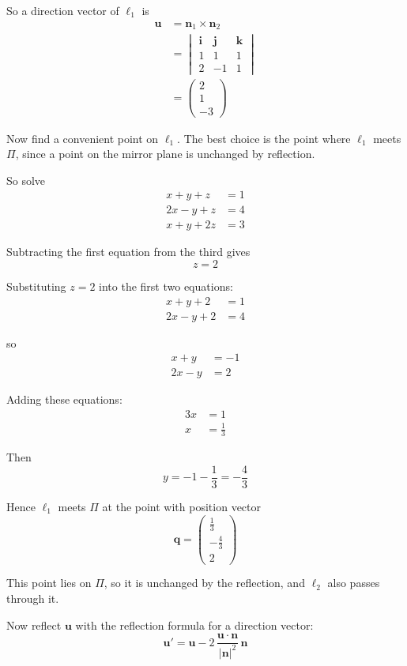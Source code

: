 \documentclass[leqno]{article}
\begin{document}
\begin{enumerate}[
  label=\textbf{\arabic*.},
  leftmargin=*,
  topsep=0pt,
  partopsep=0pt,
  parsep=0pt
]
\begin{djsSolution}
So a direction vector of \(\ell_1\) is
\begin{align*}
\mathbf u&=\mathbf n_1\times \mathbf n_2\\
&=
\begin{vmatrix}
\mathbf i&\mathbf j&\mathbf k\\
1&1&1\\
2&-1&1
\end{vmatrix}\\
&=\begin{pmatrix}2\\1\\-3\end{pmatrix}
\end{align*}

Now find a convenient point on \(\ell_1\). The best choice is the point where \(\ell_1\) meets \(\Pi\), since a point on the mirror plane is unchanged by reflection.

So solve
\begin{align*}
x+y+z&=1\\
2x-y+z&=4\\
x+y+2z&=3
\end{align*}

Subtracting the first equation from the third gives
\[
z=2
\]

Substituting \(z=2\) into the first two equations:
\begin{align*}
x+y+2&=1\\
2x-y+2&=4
\end{align*}

so
\begin{align*}
x+y&=-1\\
2x-y&=2
\end{align*}

Adding these equations:
\begin{align*}
3x&=1\\
x&=\frac13
\end{align*}

Then
\[
y=-1-\frac13=-\frac43
\]

Hence \(\ell_1\) meets \(\Pi\) at the point with position vector
\[
\mathbf q=\begin{pmatrix}\frac13\\-\frac43\\2\end{pmatrix}
\]

This point lies on \(\Pi\), so it is unchanged by the reflection, and \(\ell_2\) also passes through it.

Now reflect \(\mathbf u\) with the reflection formula for a direction vector:
\[
\mathbf u'
=
\mathbf u
-2\,\dfrac{\mathbf u\cdot\mathbf n}{|\mathbf n|^2}\,\mathbf n
\]


\end{djsSolution}
\end{enumerate}
\end{document}
